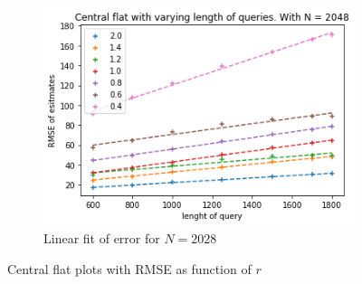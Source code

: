 \documentclass[11pt]{article}
\theoremstyle{definition}
\begin{document}
\begin{figure}[H]
\begin{subfigure}{.3\textwidth}
  \includegraphics[width=\linewidth]{figures/central_flat/varying_r/cen_flat_varying_length_N_linear_=2048.png}
  \caption{Linear fit of error for $N=2028$}
  \label{fig:cen_r_sub3_lin}
\end{subfigure}
\caption{Central flat plots with RMSE as function of $r$}
\label{fig:plt_cen_r_lin}
\end{figure}
\end{document}
